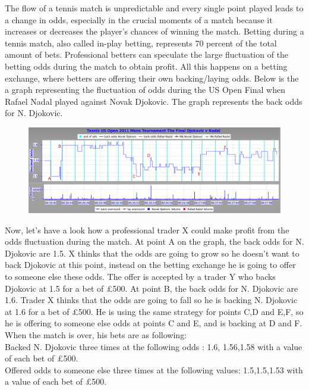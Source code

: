 \documentclass[10pt]{report}
\begin{document}
The flow of a tennis match is unpredictable and every single point played leads to a change in odds, 
especially in the crucial moments of a match because it increases or decreases the player's chances of winning the match. 
Betting during a tennis match, also called in-play betting, represents 70 percent of the total amount of bets. Professional betters can 
speculate the large fluctuation of the betting odds during the match to obtain profit. All this happens on a betting exchange, where 
betters are offering their own backing/laying odds. 
Below is the a graph representing the fluctuation of odds during the US Open Final when Rafael Nadal played against Novak Djokovic. 
The graph represents the back odds for N. Djokovic. 

\begin{figure}[ht]
\centering
\includegraphics[scale=0.4]{tenistrading.png}
\caption{}
\end{figure}

Now, let's have a look how a professional trader X could make profit from the odds fluctuation during the match.
At point A on the graph, the back odds for N. Djokovic are 1.5. X thinks that the odds are going to grow so he doesn't want to back Djokovic at this point,
instead on the betting exchange he is going to offer to someone else these odds. The offer is accepted by a trader Y who backs Djokovic at 1.5 for a bet of \pounds500. 
At point B, the back odds for N. Djokovic are 1.6. Trader X thinks that the odds are going to fall so he is backing N. Djokovic at 1.6 for a bet of \pounds500. 
He is using the same strategy for points C,D and E,F, so he is offering to someone else odds at points C and E, and is backing at D and F. \\
When the match is over, his bets are as following:\\
Backed N. Djokovic three times at the following odds : 1.6, 1.56,1.58 with a value of each bet of \pounds500. \\
Offered odds to someone else three times at the following values: 1.5,1.5,1.53 with a value of each bet of \pounds500.\\
\end{document}
